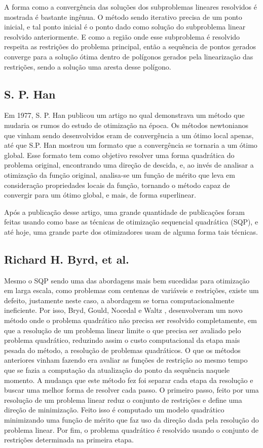 A forma como a convergência das soluções dos subproblemas lineares resolvidos é mostrada é
bastante ingênua. O método sendo iterativo precisa de um ponto inicial, e tal ponto inicial é o
ponto dado como solução do subproblema linear resolvido anteriormente. E como a região onde esse
subproblema é resolvido respeita as restrições do problema principal, então a sequência de pontos
gerados converge para a solução ótima dentro de polígonos gerados pela linearização das
restrições, sendo a solução uma aresta desse polígono.

\subsection{S. P. Han}
Em 1977, S. P. Han \cite{han1977globally} publicou um artigo no qual demonstrava um método que mudaria
os rumos do estudo de otimização na época. Os métodos newtonianos que vinham sendo desenvolvidos
eram de convergência a um ótimo local apenas, até que S.P. Han mostrou um formato que a convergência
se tornaria a um ótimo global. Esse formato tem como objetivo resolver uma forma quadrática do
problema original, encontrando uma direção de descida, e, ao invés de analisar a otimização da
função original, analisa-se um função de mérito que leva em consideração propriedades locais da
função, tornando o método capaz de convergir para um ótimo global, e mais, de forma superlinear.

Após a publicação desse artigo, uma grande quantidade de publicações foram feitas usando como
base as técnicas de otimização sequencial quadrática (SQP), e até hoje, uma grande parte dos
otimizadores usam de alguma forma tais técnicas.

\subsection{Richard H. Byrd, et al.}
Mesmo o SQP sendo uma das abordagens mais bem sucedidas para otimização em larga escala, como
problemas com centenas de variáveis e restrições, existe um defeito, justamente neste caso, a
abordagem se torna computacionalmente ineficiente. Por isso, Bryd, Gould, Nocedal e
Waltz \cite{byrd2003algorithm}, desenvolveram um novo método onde o problema quadrático não precisa
ser resolvido completamente, em que a resolução de um problema linear limite o que precisa ser
avaliado pelo problema quadrático, reduzindo assim o custo computacional da etapa mais pesada do
método, a resolução de problemas quadráticos. O que os métodos anteriores vinham fazendo era avaliar
as funções de restrição ao mesmo tempo que se fazia a computação da atualização do ponto da
sequência naquele momento. A mudança que este método fez foi separar cada etapa da resolução e
buscar uma melhor forma de resolver cada passo. O primeiro passo, feito por uma resolução de um
problema linear reduz o conjunto de restrições e define uma direção de minimização. Feito isso é
computado um modelo quadrático minimizando uma função de mérito que faz uso da direção dada pela
resolução do problema linear. Por fim, o problema quadrático é resolvido usando o conjunto de
restrições determinada na primeira etapa.
